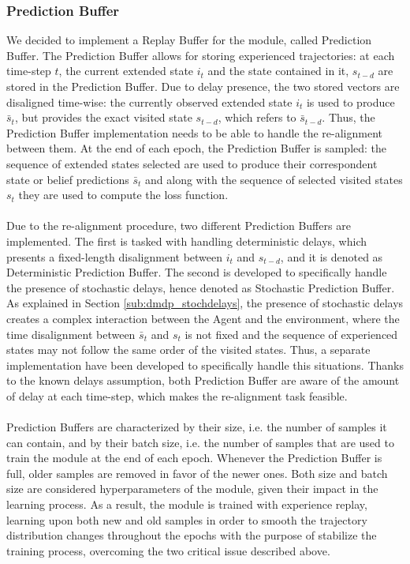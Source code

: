             \subsubsection{Prediction Buffer}
                We decided to implement a Replay Buffer for the module, called Prediction Buffer. The Prediction Buffer allows for storing experienced trajectories: at each time-step $t$, the current extended state $i_t$ and the state contained in it, $s_{t-d}$ are stored in the Prediction Buffer. Due to delay presence, the two stored vectors are disaligned time-wise: the currently observed extended state $i_t$ is used to produce $\bar{s}_t$, but provides the exact visited state $s_{t-d}$, which refers to $\bar{s}_{t-d}$. Thus, the Prediction Buffer implementation needs to be able to handle the re-alignment between them. At the end of each epoch, the Prediction Buffer is sampled: the sequence of extended states selected are used to produce their correspondent state or belief predictions $\bar{s}_t$ and along with the sequence of selected visited states $s_t$ they are used to compute the loss function.
                \\\\
                Due to the re-alignment procedure, two different Prediction Buffers are implemented. The first is tasked with handling deterministic delays, which presents a fixed-length disalignment between $i_t$ and $s_{t-d}$, and it is denoted as Deterministic Prediction Buffer. The second is developed to specifically handle the presence of stochastic delays, hence denoted as Stochastic Prediction Buffer. As explained in Section \ref{sub:dmdp_stochdelays}, the presence of stochastic delays creates a complex interaction between the Agent and the environment, where the time disalignment between $\bar{s}_t$ and $s_t$ is not fixed and the sequence of experienced states may not follow the same order of the visited states. Thus, a separate implementation have been developed to specifically handle this situations. Thanks to the known delays assumption, both Prediction Buffer are aware of the amount of delay at each time-step, which makes the re-alignment task feasible.
                \\\\
                Prediction Buffers are characterized by their size, i.e. the number of samples it can contain, and by their batch size, i.e. the number of samples that are used to train the module at the end of each epoch. Whenever the Prediction Buffer is full, older samples are removed in favor of the newer ones. Both size and batch size are considered hyperparameters of the module, given their impact in the learning process. As a result, the module is trained with experience replay, learning upon both new and old samples in order to smooth the trajectory distribution changes throughout the epochs with the purpose of stabilize the training process, overcoming the two critical issue described above.
                
